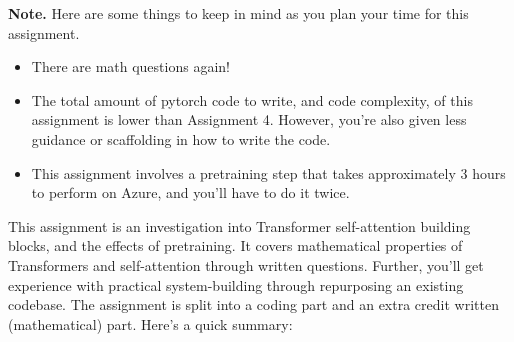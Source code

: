 \begin{framed}
\noindent
 \textbf{Note.} Here are some things to keep in mind as you plan your time for this assignment.
\begin{itemize}
   \item There are math questions again!
   \item The total amount of pytorch code to write, and code complexity, of this assignment is lower than Assignment 4. 
         However, you're also given less guidance or scaffolding in how to write the code.
         \item  This assignment involves a pretraining step that takes approximately 3 hours to perform on Azure, and you'll have to do it twice.
\end{itemize}
\end{framed}
This assignment is an investigation into Transformer self-attention building blocks, and the effects of pretraining.
It covers mathematical properties of Transformers and self-attention through written questions.
Further, you'll get experience with practical system-building through repurposing an existing codebase.
The assignment is split into a coding part and an extra credit written (mathematical) part.
Here's a quick summary:
